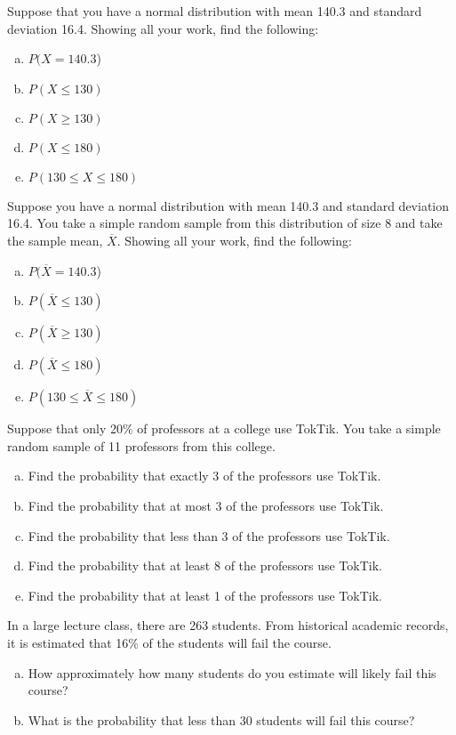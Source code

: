 \documentclass[12pt,letterpaper]{exam}
\begin{document}
\begin{questions}
\newpage
\question[10] Suppose that you have a normal distribution with mean 140.3 and standard deviation 16.4. Showing all your work, find the following:
	\begin{enumerate}[(a)]
	\item $P(X= 140.3$)
	\item $P(X \leq 130)$
	\item $P(X \geq 130)$
	\item $P(X \leq 180)$
	\item $P(130 \leq X \leq 180)$
	\end{enumerate}



\newpage
\question[10] Suppose you have a normal distribution with mean 140.3 and standard deviation 16.4. You take a simple random sample from this distribution of size 8 and take the sample mean, $\overline{X}$. Showing all your work, find the following:
	\begin{enumerate}[(a)]
	\item $P(\overline{X}= 140.3$)
	\item $P(\overline{X} \leq 130)$
	\item $P(\overline{X} \geq 130)$
	\item $P(\overline{X} \leq 180)$
	\item $P(130 \leq \overline{X} \leq 180)$
	\end{enumerate}



\newpage
\question[10] Suppose that only 20\% of professors at a college use TokTik. You take a simple random sample of 11 professors from this college.
	\begin{enumerate}[(a)]
	\item Find the probability that exactly 3 of the professors use TokTik.
	\item Find the probability that at most 3 of the professors use TokTik.
	\item Find the probability that less than 3 of the professors use TokTik.
	\item Find the probability that at least 8 of the professors use TokTik.
	\item Find the probability that at least 1 of the professors use TokTik.
	\end{enumerate}



\newpage
\question[10] In a large lecture class, there are 263 students. From historical academic records, it is estimated that 16\% of the students will fail the course. 
	\begin{enumerate}[(a)]
	\item How approximately how many students do you estimate will likely fail this course?
	\item What is the probability that less than 30 students will fail this course?
	\end{enumerate}




\end{questions}
\end{document}
